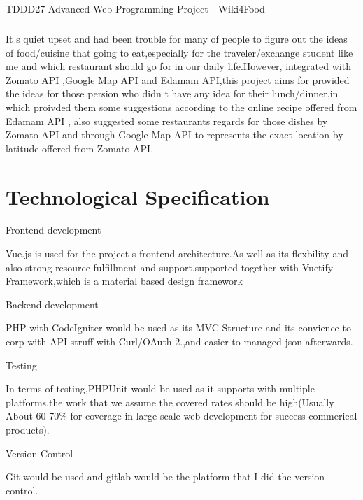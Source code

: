 T\+D\+D\+D27 Advanced Web Programming Project -\/ Wiki4\+Food \subparagraph*{}

It \textquotesingle{}s quiet upset and had been trouble for many of people to figure out the ideas of food/cuisine that going to eat,especially for the traveler/exchange student like me and which restaurant should go for in our daily life.\+However, integrated with Zomato A\+PI ,Google Map A\+PI and Edamam A\+PI,this project aims for provided the ideas for those persion who didn \textquotesingle{}t have any idea for their lunch/dinner,in which proivded them some suggestions according to the online recipe offered from Edamam A\+PI , also suggested some restaurants regards for those dishes by Zomato A\+PI and through Google Map A\+PI to represents the exact location by latitude offered from Zomato A\+PI.

\section*{Technological Specification }



 Frontend development 



Vue.\+js is used for the project \textquotesingle{}s frontend architecture.\+As well as its flexbility and also strong resource fulfillment and support,supported together with Vuetify Framework,which is a material based design framework



 Backend development 



P\+HP with Code\+Igniter would be used as its M\+VC Structure and its convience to corp with A\+PI struff with Curl/\+O\+Auth 2.,and easier to managed json afterwards.



 Testing 



In terms of testing,P\+H\+P\+Unit would be used as it supports with multiple platforms,the work that we assume the covered rates should be high(Usually About 60-\/70\% for coverage in large scale web development for success commerical products).



 Version Control 



Git would be used and gitlab would be the platform that I did the version control.



